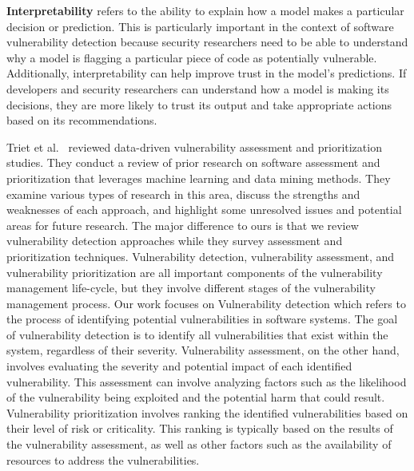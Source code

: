 \textbf{Interpretability} refers to the ability to explain how a model makes a particular decision or prediction. This is particularly important in the context of software vulnerability detection because security researchers need to be able to understand why a model is flagging a particular piece of code as potentially vulnerable. %
Additionally, interpretability can help improve trust in the model's predictions. If developers and security researchers can understand how a model is making its decisions, they are more likely to trust its output and take appropriate actions based on its recommendations. %


Triet et al.~\cite{le2021survey} reviewed data-driven vulnerability assessment and prioritization studies. They conduct a review of prior research on software assessment and prioritization that leverages machine learning and data mining methods. They examine various types of research in this area, discuss the strengths and weaknesses of each approach, and highlight some unresolved issues and potential areas for future research. The major difference to ours is that we review vulnerability detection approaches while they survey assessment and prioritization techniques. Vulnerability detection, vulnerability assessment, and vulnerability prioritization are all important components of the vulnerability management life-cycle, but they involve different stages of the vulnerability management process. Our work focuses on Vulnerability detection which refers to the process of identifying potential vulnerabilities in software systems. The goal of vulnerability detection is to identify all vulnerabilities that exist within the system, regardless of their severity. Vulnerability assessment, on the other hand, involves evaluating the severity and potential impact of each identified vulnerability. This assessment can involve analyzing factors such as the likelihood of the vulnerability being exploited and the potential harm that could result. Vulnerability prioritization involves ranking the identified vulnerabilities based on their level of risk or criticality. This ranking is typically based on the results of the vulnerability assessment, as well as other factors such as the availability of resources to address the vulnerabilities. 

